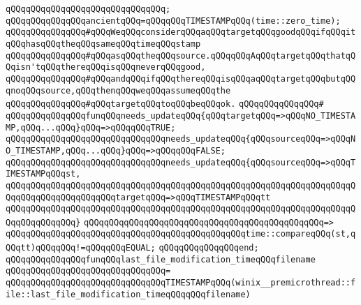 \verb|qQQqqQQqqQQqqQQqqQQqqQQqqQQqqQQq;|\newline
\newline
\verb|qQQqqQQqqQQqqQQqancientqQQq=qQQqqQQqTIMESTAMPqQQq(time::zero_time);|\newline
\newline
\newline
\newline
\verb|qQQqqQQqqQQqqQQq#qQQqWeqQQqconsiderqQQqaqQQqtargetqQQqgoodqQQqifqQQqitqQQqhasqQQqtheqQQqsameqQQqtimeqQQqstamp|\newline
\verb|qQQqqQQqqQQqqQQq#qQQqasqQQqtheqQQqsource.qQQqqQQqAqQQqtargetqQQqthatqQQqisn'tqQQqthereqQQqisqQQqneverqQQqgood,|\newline
\verb|qQQqqQQqqQQqqQQq#qQQqandqQQqifqQQqthereqQQqisqQQqaqQQqtargetqQQqbutqQQqnoqQQqsource,qQQqthenqQQqweqQQqassumeqQQqthe|\newline
\verb|qQQqqQQqqQQqqQQq#qQQqtargetqQQqtoqQQqbeqQQqok.|\newline
\verb|qQQqqQQqqQQqqQQq#|\newline
\verb|qQQqqQQqqQQqqQQqfunqQQqneeds_updateqQQq{qQQqtargetqQQq=>qQQqNO_TIMESTAMP,qQQq...qQQq}qQQq=>qQQqqQQqTRUE;|\newline
\verb|qQQqqQQqqQQqqQQqqQQqqQQqqQQqqQQqneeds_updateqQQq{qQQqsourceqQQq=>qQQqNO_TIMESTAMP,qQQq...qQQq}qQQq=>qQQqqQQqFALSE;|\newline
\newline
\verb|qQQqqQQqqQQqqQQqqQQqqQQqqQQqqQQqneeds_updateqQQq{qQQqsourceqQQq=>qQQqTIMESTAMPqQQqst,|\newline
\verb|qQQqqQQqqQQqqQQqqQQqqQQqqQQqqQQqqQQqqQQqqQQqqQQqqQQqqQQqqQQqqQQqqQQqqQQqqQQqqQQqqQQqqQQqqQQqtargetqQQq=>qQQqTIMESTAMPqQQqtt|\newline
\verb|qQQqqQQqqQQqqQQqqQQqqQQqqQQqqQQqqQQqqQQqqQQqqQQqqQQqqQQqqQQqqQQqqQQqqQQqqQQqqQQqqQQq}|\newline
\verb|qQQqqQQqqQQqqQQqqQQqqQQqqQQqqQQqqQQqqQQqqQQqqQQq=>|\newline
\verb|qQQqqQQqqQQqqQQqqQQqqQQqqQQqqQQqqQQqqQQqqQQqqQQqtime::compareqQQq(st,qQQqtt)qQQqqQQq!=qQQqqQQqEQUAL;|\newline
\verb|qQQqqQQqqQQqqQQqend;|\newline
\newline
\newline
\verb|qQQqqQQqqQQqqQQqfunqQQqlast_file_modification_timeqQQqfilename|\newline
\verb|qQQqqQQqqQQqqQQqqQQqqQQqqQQqqQQq=|\newline
\verb|qQQqqQQqqQQqqQQqqQQqqQQqqQQqqQQqTIMESTAMPqQQq(winix__premicrothread::file::last_file_modification_timeqQQqqQQqfilename)|\newline

